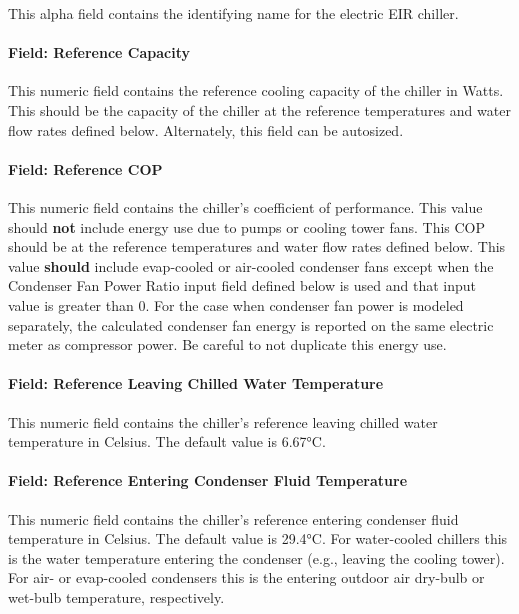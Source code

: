This alpha field contains the identifying name for the electric EIR chiller.

\paragraph{Field: Reference Capacity}\label{field-reference-capacity}

This numeric field contains the reference cooling capacity of the chiller in Watts. This should be the capacity of the chiller at the reference temperatures and water flow rates defined below. Alternately, this field can be autosized.

\paragraph{Field: Reference COP}\label{field-reference-cop}

This numeric field contains the chiller's coefficient of performance. This value should \textbf{not} include energy use due to pumps or cooling tower fans. This COP should be at the reference temperatures and water flow rates defined below. This value \textbf{should} include evap-cooled or air-cooled condenser fans except when the Condenser Fan Power Ratio input field defined below is used and that input value is greater than 0. For the case when condenser fan power is modeled separately, the calculated condenser fan energy is reported on the same electric meter as compressor power. Be careful to not duplicate this energy use.

\paragraph{Field: Reference Leaving Chilled Water Temperature}\label{field-reference-leaving-chilled-water-temperature}

This numeric field contains the chiller's reference leaving chilled water temperature in Celsius. The default value is 6.67°C.

\paragraph{Field: Reference Entering Condenser Fluid Temperature}\label{field-reference-entering-condenser-fluid-temperature}

This numeric field contains the chiller's reference entering condenser fluid temperature in Celsius. The default value is 29.4°C. For water-cooled chillers this is the water temperature entering the condenser (e.g., leaving the cooling tower). For air- or evap-cooled condensers this is the entering outdoor air dry-bulb or wet-bulb temperature, respectively.

